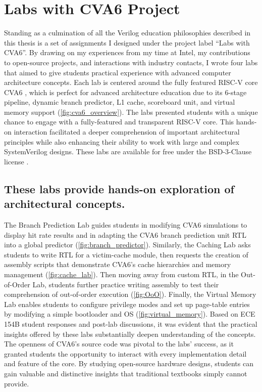 
\chapter{Labs with CVA6 Project}
\label{chapter:labs_with_cva6}



Standing as a culmination of all the Verilog education philosophies described in this thesis is a set of assignments I designed under the project label ``Labs with CVA6''. By drawing on my experiences from my time at Intel, my contributions to open-source projects, and interactions with industry contacts, I wrote four labs that aimed to give students practical experience with advanced computer architecture concepts. Each lab is centered around the fully featured RISC-V core CVA6 \cite{cva6}, which is perfect for advanced architecture education due to its 6-stage pipeline, dynamic branch predictor, L1 cache, scoreboard unit, and virtual memory support (\autoref{fig:cva6_overview}). The labs presented students with a unique chance to engage with a fully-featured and transparent RISC-V core. This hands-on interaction facilitated a deeper comprehension of important architectural principles while also enhancing their ability to work with large and complex SystemVerilog designs. These labs are available for free under the BSD-3-Clause license \cite{labsWithCVA6}.

\FloatBarrier

\section{These labs provide hands-on exploration of architectural concepts.}






The Branch Prediction Lab guides students in modifying CVA6 simulations to display hit rate results and in adapting the CVA6 branch prediction unit RTL into a global predictor (\autoref{fig:branch_predictor}). Similarly, the Caching Lab asks students to write RTL for a victim-cache module, then requests the creation of assembly scripts that demonstrate CVA6's cache hierarchies and memory management (\autoref{fig:cache_lab}). Then moving away from custom RTL, in the Out-of-Order Lab, students further practice writing assembly to test their comprehension of out-of-order execution (\autoref{fig:OoO}). Finally, the Virtual Memory Lab enables students to configure privilege modes and set up page-table entries by modifying a simple bootloader and OS (\autoref{fig:virtual_memory}). Based on ECE 154B student responses and post-lab discussions, it was evident that the practical insights offered by these labs substantially deepen understanding of the concepts. The openness of CVA6's source code was pivotal to the labs' success, as it granted students the opportunity to interact with every implementation detail and feature of the core. By studying open-source hardware designs, students can gain valuable and distinctive insights that traditional textbooks simply cannot provide.

